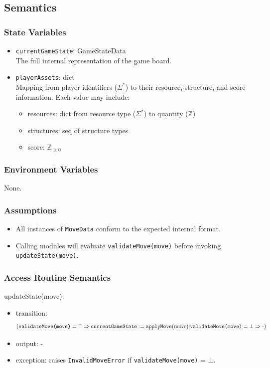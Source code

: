 \documentclass[12pt, titlepage]{article}
\begin{document}
\subsection{Semantics}

\subsubsection{State Variables}
\begin{itemize}
\item \texttt{currentGameState}: GameStateData \\
      The full internal representation of the game board.

\item \texttt{playerAssets}: dict \\
      Mapping from player identifiers ($\Sigma^{*}$) to their resource, structure,  
      and score information. Each value may include:
      \begin{itemize}
          \item resources: dict from resource type ($\Sigma^{*}$) to quantity ($\mathbb{Z}$)
          \item structures: seq of structure types
          \item score: $\mathbb{Z}_{\ge 0}$
      \end{itemize}
\end{itemize}

\subsubsection{Environment Variables}
None.

\subsubsection{Assumptions}
\begin{itemize}
    \item All instances of \texttt{MoveData} conform to the expected internal format.
    \item Calling modules will evaluate \texttt{validateMove(move)} before invoking \texttt{updateState(move)}.
\end{itemize}

\subsubsection{Access Routine Semantics}

\noindent updateState(move):
\begin{itemize}
  \item transition:
  \[
  (
    \texttt{validateMove(move)} = \top \Rightarrow
      \text{\texttt{currentGameState}} := \text{\texttt{applyMove}} (\text{move})
  |
    \texttt{validateMove(move)} = \bot \Rightarrow
      \text{-}
  )
  \]
\item output: -
\item exception: raises \texttt{InvalidMoveError} if \texttt{validateMove(move)} = $\bot$.
\end{itemize}
\end{document}
